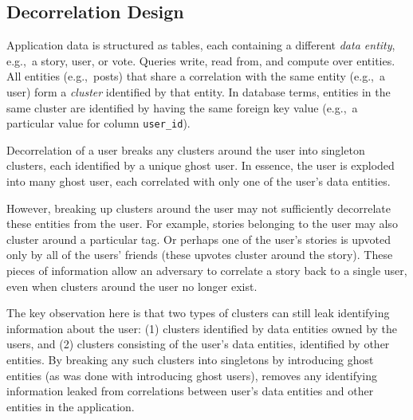 \subsection{Decorrelation Design}
Application data is structured as tables, each containing a different \emph{data entity}, e.g.,\ a
story, user, or vote. Queries write, read from, and compute over entities.  All entities (e.g.,\
posts) that share a correlation with the same entity (e.g.,\ a user) form a \emph{cluster}
identified by that entity. In database terms, entities in the same cluster are identified by having
the same foreign key value (e.g.,\ a particular value for column \texttt{user\_id}). 

Decorrelation of a user breaks any clusters around the user into singleton clusters, each identified
by a unique ghost user. In essence, the user is exploded into many ghost user, each correlated with
only one of the user's data entities.

However, breaking up clusters around the user may not sufficiently decorrelate these entities from
the user. For example, stories belonging to the user may also cluster around a particular tag. Or
perhaps one of the user's stories is upvoted only by all of the users' friends (these upvotes
cluster around the story). These pieces of information allow an adversary to correlate a story back
to a single user, even when clusters around the user no longer exist.

The key observation here is that two types of clusters can still leak identifying information about
the user: (1) clusters identified by data entities owned by the users, and (2) clusters consisting
of the user's data entities, identified by other entities.  By breaking any such clusters into
singletons by introducing ghost entities (as was done with introducing ghost users), \sys{} removes
any identifying information leaked from correlations between user's data entities and other entities
in the application.

